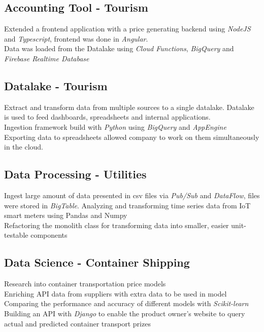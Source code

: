 \documentclass{article}
\begin{document}
\subsection{Accounting Tool - Tourism}
Extended a frontend application with a price generating backend using \emph{NodeJS} and \emph{Typescript}, frontend was done in \emph{Angular}. \\
Data was loaded from the Datalake using \emph{Cloud Functions}, \emph{BigQuery} and \emph{Firebase Realtime Database} \\

\subsection{Datalake - Tourism}
Extract and transform data from multiple sources to a single datalake. Datalake is used to feed dashboards, spreadsheets and internal applications. \\
Ingestion framework build with \emph{Python} using \emph{BigQuery} and \emph{AppEngine} \\
Exporting data to spreadsheets allowed company to work on them simultaneously in the cloud. \\

\subsection{Data Processing - Utilities}
Ingest large amount of data presented in csv files via \emph{Pub/Sub} and \emph{DataFlow}, files were stored in \emph{BigTable}.
Analyzing and transforming time series data from IoT smart meters using Pandas and Numpy \\
Refactoring the monolith class for transforming data into smaller, easier unit-testable components \\

\subsection{Data Science - Container Shipping}
Research into container transportation price models \\
Enriching API data from suppliers with extra data to be used in model \\
Comparing the performance and accuracy of different models with \emph{Scikit-learn} \\
Building an API with \emph{Django} to enable the product owner's website to query actual and predicted container transport prizes \\
\end{document}
